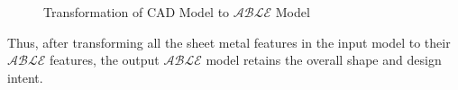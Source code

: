 \begin{figure}[!h]
\centering     %
{} \quad
{} \quad
\caption{Transformation of CAD Model to $\mathcal{ABLE}$ Model}
\label{fig:results:enlosureable}
\end{figure}




Thus, after transforming all the sheet metal features in the input model to their $\mathcal{ABLE}$ features, the output $\mathcal{ABLE}$ model retains the overall shape and design intent.

%
%
%
%
%

